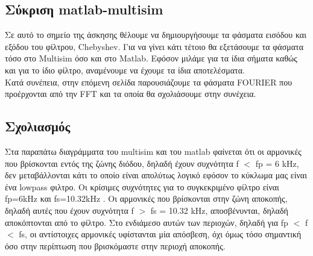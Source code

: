\documentclass{article}
\begin{document}
{\subsection*{Σύκριση matlab-multisim}
\large{}
Σε αυτό το σημείο της άσκησης θέλουμε να δημιουργήσουμε τα φάσματα εισόδου και εξόδου του φίλτρου, Chebyshev. Για να γίνει κάτι τέτοιο θα εξετάσουμε τα φάσματα τόσο στο Multisim όσο και στο Matlab. Εφόσον μιλάμε για τα ίδια σήματα καθώς και για το ίδιο φίλτρο, αναμένουμε να έχουμε τα ίδια αποτελέσματα. \\[0.4\baselineskip]
Κατά συνέπεια, στην επόμενη σελίδα παρουσιάζουμε τα φάσματα FOURIER που προέρχονται από την FFT και τα οποία θα σχολιάσουμε στην συνέχεια.\\[1.8\baselineskip]
\subsection*{Σχολιασμός}
Στα παραπάτω διαγράμματα του multisim και του matlab φαίνεται ότι οι αρμονικές που βρίσκονται εντός της ζώνης διόδου, δηλαδή έχουν συχνότητα f $<$ fp = 6 kHz, δεν μεταβάλλονται κάτι το οποίο είναι απολύτως λογικό εφόσον το κύκλωμα μας είναι ένα lowpass φιλτρο. Οι κρίσιμες συχνότητες για το συγκεκριμένο φίλτρο είναι fp=6kHz και fs=10.32kHz . Οι αρμονικές που βρίσκονται στην ζώνη αποκοπής, δηλαδή αυτές που έχουν συχνότητα f $>$ fs = 10.32 kHz, αποσβένυνται, δηλαδή αποκόπτονται από το φίλτρο. Στο ενδιάμεσο αυτών των περιοχών, δηλαδή για fp $<$ f $<$ fs, οι
αντίστοιχες αρμονικές υφίστανται μία απόσβεση, όχι όμως τόσο σημαντική
όσο στην περίπτωση που βρισκόμαστε στην περιοχή αποκοπής.



}
\end{document}
